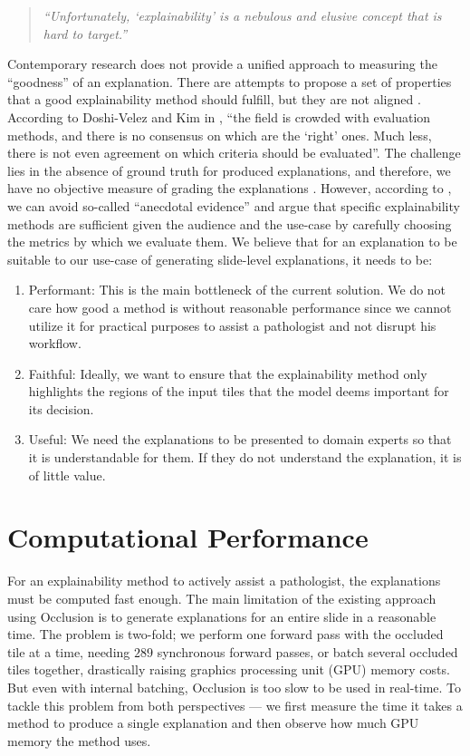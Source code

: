 \begin{quote}
    \emph{``Unfortunately, `explainability' is a nebulous and elusive concept that is hard to target.''} \cite{explainability-hard}
\end{quote}

Contemporary research does not provide a unified approach to measuring the ``goodness'' of an explanation.
There are attempts to propose a set of properties that a good explainability method should fulfill, but they are not aligned \cite{xai-functionality-grounded, explainability-hard, xai-meta-survey, xai-zhou-survey}.
According to Doshi-Velez and Kim in \cite{xai-doshi}, ``the field is crowded with evaluation methods, and there is no consensus on which are the `right' ones. 
Much less, there is not even agreement on which criteria should be evaluated''.
The challenge lies in the absence of ground truth for produced explanations, and therefore, we have no objective measure of grading the explanations \cite{xai-zhou-survey}.
However, according to \cite{xai-anecdotal-evidence}, we can avoid so-called ``anecdotal evidence'' and argue that specific explainability methods are sufficient given the audience and the use-case by carefully choosing the metrics by which we evaluate them.
We believe that for an explanation to be suitable to our use-case of generating slide-level explanations, it needs to be:
\begin{enumerate}
    \item Performant: This is the main bottleneck of the current solution. We do not care how good a method is without reasonable performance since we cannot utilize it for practical purposes to assist a pathologist and not disrupt his workflow.
    \item Faithful: Ideally, we want to ensure that the explainability method only highlights the regions of the input tiles that the model deems important for its decision.
    \item Useful: We need the explanations to be presented to domain experts so that it is understandable for them. If they do not understand the explanation, it is of little value. 
\end{enumerate}

\section{Computational Performance}

For an explainability method to actively assist a pathologist, the explanations must be computed fast enough.
The main limitation of the existing approach using Occlusion is to generate explanations for an entire slide in a reasonable time.
The problem is two-fold; we perform one forward pass with the occluded tile at a time, needing $289$ synchronous forward passes, or batch several occluded tiles together, drastically raising graphics processing unit (GPU) memory costs.
But even with internal batching, Occlusion is too slow to be used in real-time.
To tackle this problem from both perspectives --- we first measure the time it takes a method to produce a single explanation and then observe how much GPU memory the method uses.

